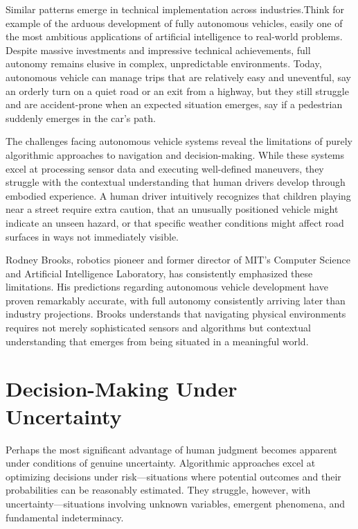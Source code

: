 \documentclass[
  Letterpaper,
]{scrbook}
\begin{document}
Similar patterns emerge in technical implementation across
industries.Think for example of the arduous development of fully
autonomous vehicles, easily one of the most ambitious applications of
artificial intelligence to real-world problems. Despite massive
investments and impressive technical achievements, full autonomy remains
elusive in complex, unpredictable environments. Today, autonomous
vehicle can manage trips that are relatively easy and uneventful, say an
orderly turn on a quiet road or an exit from a highway, but they still
struggle and are accident-prone when an expected situation emerges, say
if a pedestrian suddenly emerges in the car's path.

The challenges facing autonomous vehicle systems reveal the limitations
of purely algorithmic approaches to navigation and decision-making.
While these systems excel at processing sensor data and executing
well-defined maneuvers, they struggle with the contextual understanding
that human drivers develop through embodied experience. A human driver
intuitively recognizes that children playing near a street require extra
caution, that an unusually positioned vehicle might indicate an unseen
hazard, or that specific weather conditions might affect road surfaces
in ways not immediately visible.

Rodney Brooks, robotics pioneer and former director of MIT's Computer
Science and Artificial Intelligence Laboratory, has consistently
emphasized these limitations. His predictions regarding autonomous
vehicle development have proven remarkably accurate, with full autonomy
consistently arriving later than industry projections. Brooks
understands that navigating physical environments requires not merely
sophisticated sensors and algorithms but contextual understanding that
emerges from being situated in a meaningful world.

\section{Decision-Making Under
Uncertainty}\label{decision-making-under-uncertainty}

Perhaps the most significant advantage of human judgment becomes
apparent under conditions of genuine uncertainty. Algorithmic approaches
excel at optimizing decisions under risk---situations where potential
outcomes and their probabilities can be reasonably estimated. They
struggle, however, with uncertainty---situations involving unknown
variables, emergent phenomena, and fundamental indeterminacy.
\end{document}
